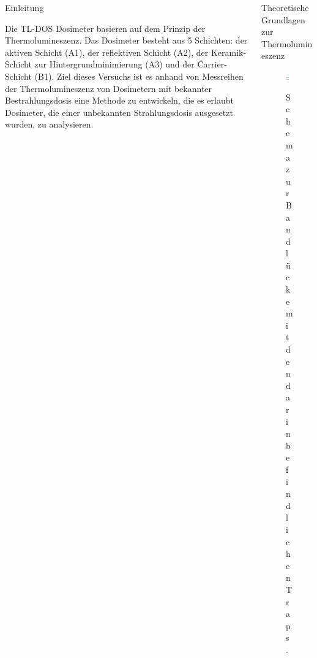 \documentclass[20pt]{beamer}
\begin{document}
\begin{columns}[onlytextwidth]
\begin{column}{0.5\textwidth}
\begin{block}[equal height group=A]{Einleitung}
\begin{multicols}{2}
                  \begin{large}
                      Die TL-DOS Dosimeter basieren auf dem Prinzip der Thermolumineszenz. Das Dosimeter besteht aus 5 Schichten: der aktiven Schicht (A1), der reflektiven Schicht (A2), der Keramik-Schicht zur Hintergrundminimierung (A3) und der Carrier-Schicht (B1). Ziel dieses Versuchs ist es anhand von Messreihen der Thermolumineszenz von Dosimetern mit bekannter Bestrahlungsdosis eine Methode zu entwickeln, die es erlaubt Dosimeter, die einer unbekannten Strahlungsdosis ausgesetzt wurden, zu analysieren. 
                  \end{large}
        \end{multicols}      
      \end{block}%
    \end{column}%
    \begin{column}{0.5\textwidth}%
      \begin{block}[equal height group=A]{Theoretische Grundlagen zur Thermolumineszenz}%
        \begin{multicols}{2}
          \begin{figure}
            \includegraphics[width=\linewidth]{bilder/gap}\\
            \caption{Schema zur Bandlücke mit den darin befindlichen Traps. \cite{gap} }
            \label{gap}
          \end{figure}
                  \begin{large}

\end{large}
\end{multicols}
\end{block}
\end{column}
\end{columns}
\end{document}
